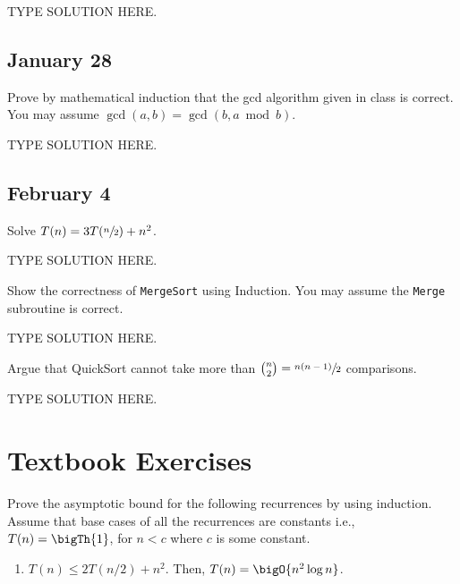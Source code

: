 \documentclass[draft]{article}
\begin{document}
\begin{solution}
    TYPE SOLUTION HERE.
\end{solution}

\subsection{January 28}
\begin{question}
    Prove by mathematical induction that the gcd algorithm given in class is correct. You may assume $\gcd(a,b)=\gcd(b, a \bmod b)$.
\end{question}

\begin{solution}
    TYPE SOLUTION HERE.
\end{solution}

\subsection{February 4}
\begin{question}
    Solve $T(n) = 3T(\sfrac{n}{2}) + n^2$.
\end{question}

\begin{solution}
    TYPE SOLUTION HERE.
\end{solution}

\begin{question}
    Show the correctness of \texttt{MergeSort} using Induction. You may assume the \texttt{Merge} subroutine is correct.
\end{question}

\begin{solution}
    TYPE SOLUTION HERE.
\end{solution}

\begin{question}
    Argue that QuickSort cannot take more than $\binom{n}{2} = \sfrac{n(n - 1)}{2}$ comparisons.
\end{question}

\begin{solution}
    TYPE SOLUTION HERE.
\end{solution}

\section{Textbook Exercises}
\begin{exercise}{4.1}
    Prove the asymptotic bound for the following recurrences by using
    induction. Assume that base cases of all the recurrences are
    constants i.e., $ T(n) = \bigTh{1}$, for $n < c$ where $c$ is some
    constant.
    \begin{enumerate}[label=(\alph*)]
        \item $T(n) \leq 2 T(n/2) + n^2$. Then, $T(n) = \bigO{n^2 \log n}$.
    \end{enumerate}
\end{exercise}
\end{document}
